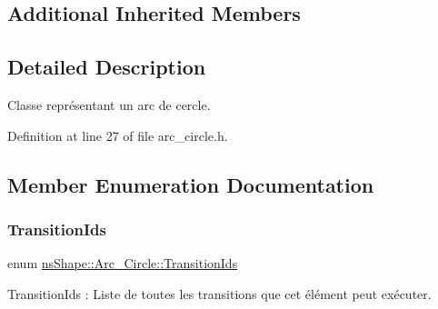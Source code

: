 \subsection*{Additional Inherited Members}


\subsection{Detailed Description}
Classe représentant un arc de cercle. 

Definition at line 27 of file arc\+\_\+circle.\+h.



\subsection{Member Enumeration Documentation}
\mbox{\label{classns_shape_1_1_arc___circle_aa6db8d435868af65e4ea134f37118415}} 
\subsubsection{\texorpdfstring{Transition\+Ids}{TransitionIds}}
{\footnotesize\ttfamily enum \hyperlink{classns_shape_1_1_arc___circle_aa6db8d435868af65e4ea134f37118415}{ns\+Shape\+::\+Arc\+\_\+\+Circle\+::\+Transition\+Ids}}



Transition\+Ids \+: Liste de toutes les transitions que cet élément peut exécuter. 

